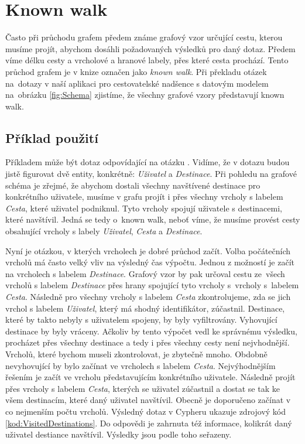 \documentclass[
  program=infoi,
  biblatex=true,
  sourcecodes=true,
  figures=true,
  glossaries=false,
  index
]{kidiplom}
\begin{document}

\section{Known walk}
Často při průchodu grafem předem známe grafový vzor určující cestu, kterou musíme projít, abychom dosáhli požadovaných výsledků pro daný dotaz. Předem víme délku cesty a vrcholové a hranové labely, přes které cesta prochází. Tento průchod grafem je v knize \cite{inAction} označen jako \textit{known walk}. Při překladu otázek na~dotazy v naší aplikaci pro cestovatelské nadšence s datovým modelem na~obrázku \ref{fig:Schema} zjistíme, že všechny grafové vzory představují known walk.

\subsection{Příklad použití}
Příkladem může být dotaz odpovídající na otázku . Vidíme, že v dotazu budou jistě figurovat dvě entity, konkrétně: \textit{Uživatel} a \textit{Destinace}. Při pohledu na grafové schéma je zřejmé, že abychom dostali všechny navštívené destinace pro konkrétního uživatele, musíme v grafu projít i přes všechny vrcholy s labelem \textit{Cesta}, které uživatel podniknul. Tyto vrcholy spojují uživatele s destinacemi, které navštívil. Jedná se tedy o~known walk, neboť víme, že musíme provést cesty obsahující vrcholy s labely \textit{Uživatel}, \textit{Cesta} a \textit{Destinace}.

Nyní je otázkou, v kterých vrcholech je dobré průchod začít. Volba počátečních vrcholů má často velký vliv na výsledný čas výpočtu. Jednou z možností je začít na vrcholech s labelem \textit{Destinace}. Grafový vzor by pak určoval cestu ze~všech vrcholů s labelem \textit{Destinace} přes hrany spojující tyto vrcholy s~vrcholy s~labelem \textit{Cesta}. Následně pro všechny vrcholy s labelem \textit{Cesta} zkontrolujeme, zda se jich vrchol s labelem \textit{Uživatel}, který má shodný identifikátor, zúčastnil. Destinace, které by takto nebyly s uživatelem spojeny, by byly vyfiltrovány. Vyhovující destinace by byly vráceny. Ačkoliv by tento výpočet vedl ke správnému výsledku, procházet přes všechny destinace a tedy i přes všechny cesty není nejvhodnější. Vrcholů, které bychom museli zkontrolovat, je zbytečně mnoho. Obdobně nevyhovující by bylo začínat ve vrcholech s labelem \textit{Cesta}. Nejvýhodnějším řešením je začít ve vrcholu představujícím konkrétního uživatele. Následně projít přes vrcholy s labelem \textit{Cesta}, kterých se uživatel zúčastnil a dostat se tak ke všem destinacím, které daný uživatel navštívil. Obecně je doporučeno začínat v co nejmenším počtu vrcholů. Výsledný dotaz v Cypheru ukazuje zdrojový kód \ref{kod:VisitedDestinations}. Do odpovědi je zahrnuta též informace, kolikrát daný uživatel destiance navštívil. Výsledky jsou podle toho seřazeny.
\end{document}
